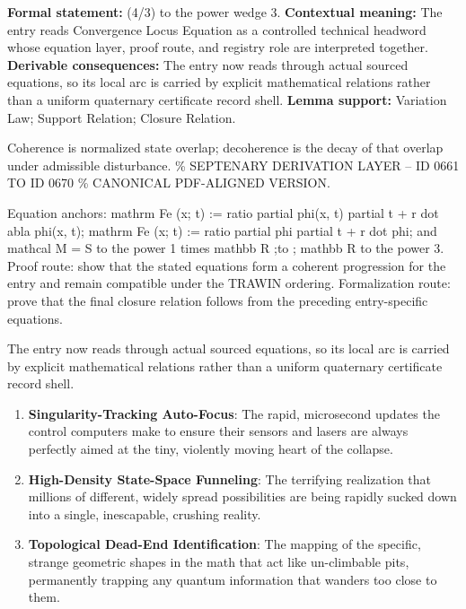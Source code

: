 \begingroup\footnotesize\setlength{\emergencystretch}{3em}\sloppy
\textbf{Formal statement:} (4/3) to the power wedge 3. \textbf{Contextual meaning:} The entry reads Convergence Locus Equation as a controlled technical headword whose equation layer, proof route, and registry role are interpreted together. \textbf{Derivable consequences:} The entry now reads through actual sourced equations, so its local arc is carried by explicit mathematical relations rather than a uniform quaternary certificate record shell. \textbf{Lemma support:} Variation Law; Support Relation; Closure Relation.\par
\endgroup

Coherence is normalized state overlap; decoherence is the decay of that overlap under admissible disturbance. \% SEPTENARY DERIVATION LAYER -- ID 0661 TO ID 0670 \% CANONICAL PDF-ALIGNED VERSION.

Equation anchors: mathrm Fe (x; t) := ratio partial phi(x, t) partial t + r dot abla phi(x, t); mathrm Fe (x; t) := ratio partial phi partial t + r dot phi; and mathcal M = S to the power 1 times mathbb R ;to ; mathbb R to the power 3. Proof route: show that the stated equations form a coherent progression for the entry and remain compatible under the TRAWIN ordering. Formalization route: prove that the final closure relation follows from the preceding entry-specific equations.

The entry now reads through actual sourced equations, so its local arc is carried by explicit mathematical relations rather than a uniform quaternary certificate record shell.
\endgroup

\begin{enumerate}[leftmargin=1.6em,itemsep=6pt,topsep=4pt]
\item \textbf{Singularity-Tracking Auto-Focus}: The rapid, microsecond updates the control computers make to ensure their sensors and lasers are always perfectly aimed at the tiny, violently moving heart of the collapse.
\item \textbf{High-Density State-Space Funneling}: The terrifying realization that millions of different, widely spread possibilities are being rapidly sucked down into a single, inescapable, crushing reality.
\item \textbf{Topological Dead-End Identification}: The mapping of the specific, strange geometric shapes in the math that act like un-climbable pits, permanently trapping any quantum information that wanders too close to them.
\end{enumerate}

